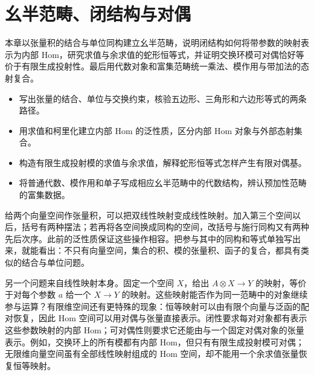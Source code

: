 
\chapter{幺半范畴、闭结构与对偶}
\label{b4:ch:monoidal}

\begin{chapterabstract}
	本章以张量积的结合与单位同构建立幺半范畴，说明闭结构如何将带参数的映射表示为内部 Hom，研究求值与余求值的蛇形恒等式，并证明交换环模可对偶恰好等价于有限生成投射性。最后用代数对象和富集范畴统一乘法、模作用与带加法的态射复合。
\end{chapterabstract}

\begin{learninggoals}
	\begin{itemize}
		\item 写出张量的结合、单位与交换约束，核验五边形、三角形和六边形等式的两条路径。
		\item 用求值和柯里化建立内部 Hom 的泛性质，区分内部 Hom 对象与外部态射集合。
		\item 构造有限生成投射模的求值与余求值，解释蛇形恒等式怎样产生有限对偶基。
		\item 将普通代数、模作用和单子写成相应幺半范畴中的代数结构，辨认预加性范畴的富集数据。
	\end{itemize}
\end{learninggoals}

给两个向量空间作张量积，可以把双线性映射变成线性映射。加入第三个空间以后，括号有两种摆法；若再将各空间换成同构的空间，改括号与施行同构又有两种先后次序。此前的泛性质保证这些操作相容。把参与其中的同构和等式单独写出来，就能看出：不只有向量空间，集合的积、模的张量积、函子的复合，都具有类似的结合与单位问题。

\ProseParagraphBreak

另一个问题来自线性映射本身。固定一个空间 \(X\)，给出 \(A\otimes X\to Y\) 的映射，等价于对每个参数 \(a\) 给一个 \(X\to Y\) 的映射。这些映射能否作为同一范畴中的对象继续参与运算？有限维空间还有更特殊的现象：恒等映射可以由有限个向量与泛函的配对恢复，因此 Hom 空间可以用对偶与张量直接表示。闭性要求每对对象都有表示这些参数映射的内部 Hom；可对偶性则要求它还能由与一个固定对偶对象的张量表示。例如，交换环上的所有模都有内部 Hom，但只有有限生成投射模可对偶；无限维向量空间虽有全部线性映射组成的 Hom 空间，却不能用一个余求值张量恢复恒等映射。

\ProseParagraphBreak

